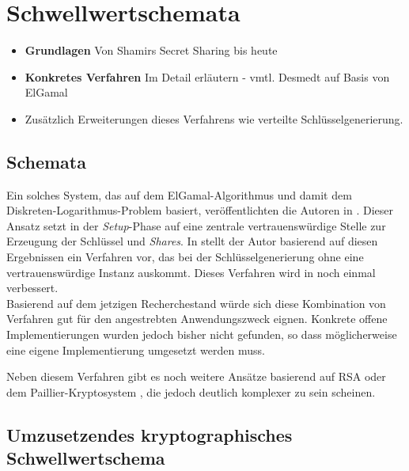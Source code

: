 \section{Schwellwertschemata}

\begin{itemize}
  \item \textbf{Grundlagen} Von Shamirs Secret Sharing bis heute
  \item \textbf{Konkretes Verfahren} Im Detail erläutern - vmtl. Desmedt auf Basis von ElGamal
  \item Zusätzlich Erweiterungen dieses Verfahrens wie verteilte Schlüsselgenerierung.
\end{itemize}

\label{sec_state_threshold}

\subsection{Schemata}


Ein solches System, das auf dem ElGamal-Algorithmus und damit dem Diskreten-Logarithmus-Problem basiert, veröffentlichten die Autoren in \cite{DesmedtFrankel1990}.  Dieser Ansatz setzt in der \textit{Setup}-Phase auf eine zentrale vertrauenswürdige Stelle zur Erzeugung der Schlüssel und \textit{Shares}. In \cite{pedersen1991} stellt der Autor basierend auf diesen Ergebnissen ein Verfahren vor, das bei der Schlüsselgenerierung ohne eine vertrauenswürdige Instanz auskommt. Dieses Verfahren wird in \cite{gennaro1999} noch einmal verbessert.\\
Basierend auf dem jetzigen Recherchestand würde sich diese Kombination von Verfahren gut für den angestrebten Anwendungszweck eignen. Konkrete offene Implementierungen wurden jedoch bisher nicht gefunden, so dass möglicherweise eine eigene Implementierung umgesetzt werden muss.

Neben diesem Verfahren gibt es noch weitere Ansätze basierend auf RSA \cite{desmedt1993, nguyen2005} oder dem Paillier-Kryptosystem \cite{paillier1999, damgard2001}, die jedoch deutlich komplexer zu sein scheinen. 

\subsection{Umzusetzendes kryptographisches Schwellwertschema}


